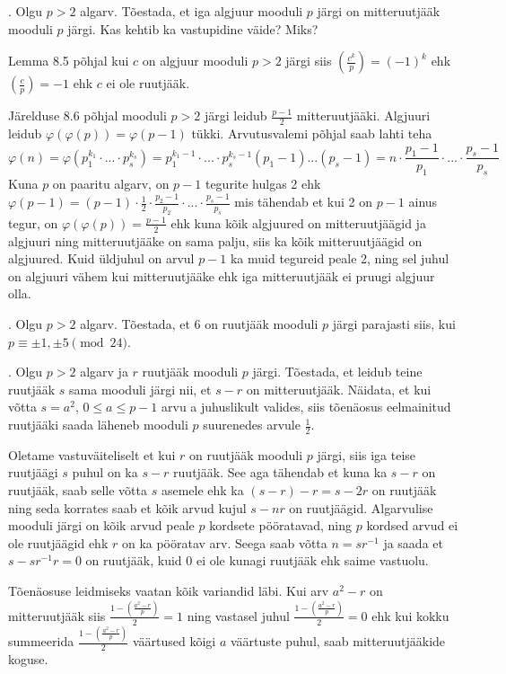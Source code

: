 \documentclass[a4paper, 10pt]{article}
\newcommand{\leg}[2]{\left(\frac{#1}{#2}\right)}
\begin{document}
. Olgu $p>2$ algarv. Tõestada, et iga algjuur mooduli $p$ järgi on mitteruutjääk mooduli $p$ järgi. Kas kehtib ka vastupidine väide? Miks?

\bigskip
Lemma 8.5 põhjal kui $c$ on algjuur mooduli $p>2$ järgi siis $\leg {c^k}p=(-1)^k$ ehk $\leg cp=-1$ ehk $c$ ei ole ruutjääk.

Järelduse 8.6 põhjal mooduli $p>2$ järgi leidub $\frac {p-1}2$ mitteruutjääki. Algjuuri leidub $\varphi(\varphi(p))=\varphi(p-1)$ tükki. Arvutusvalemi põhjal saab lahti teha $$\varphi(n)=\varphi(p_1^{k_1}\cdot...\cdot p_s^{k_s})=p_1^{k_1-1}\cdot...\cdot p_s^{k_s-1}(p_1-1)...(p_s-1)=n\cdot\frac{p_1-1}{p_1}\cdot...\cdot\frac{p_s-1}{p_s}$$
Kuna $p$ on paaritu algarv, on $p-1$ tegurite hulgas 2 ehk $\varphi(p-1)=(p-1)\cdot\frac12\cdot\frac{p_2-1}{p_2}\cdot...\cdot\frac{p_s-1}{p_s}$ mis tähendab et kui 2 on $p-1$ ainus tegur, on $\varphi(\varphi(p))=\frac{p-1}2$ ehk kuna kõik algjuured on mitteruutjäägid ja algjuuri ning mitteruutjääke on sama palju, siis ka kõik mitteruutjäägid on algjuured. Kuid üldjuhul on arvul $p-1$ ka muid tegureid peale 2, ning sel juhul on algjuuri vähem kui mitteruutjääke ehk iga mitteruutjääk ei pruugi algjuur olla.
\bigskip

. Olgu $p>2$ algarv. Tõestada, et 6 on ruutjääk mooduli $p$ järgi parajasti siis, kui $p\equiv \pm1,\pm5\pmod{24}$. 

\bigskip

. Olgu $p>2$ algarv ja $r$ ruutjääk mooduli $p$ järgi. Tõestada, et leidub teine ruutjääk $s$ sama mooduli järgi nii, et $s-r$ on mitteruutjääk. Näidata, et kui võtta $s=a^2$, $0\leq a\leq p-1$ arvu a juhuslikult valides, siis tõenäosus eelmainitud ruutjääki saada läheneb mooduli $p$ suurenedes arvule $\frac12$. 

\bigskip
Oletame vastuväiteliselt et kui $r$ on ruutjääk mooduli $p$ järgi, siis iga teise ruutjäägi $s$ puhul on ka $s-r$ ruutjääk. See aga tähendab et kuna ka $s-r$ on ruutjääk, saab selle võtta $s$ asemele ehk ka $(s-r)-r=s-2r$ on ruutjääk ning seda korrates saab et kõik arvud kujul $s-nr$ on ruutjäägid. Algarvulise mooduli järgi on kõik arvud peale $p$ kordsete pööratavad, ning $p$ kordsed arvud ei ole ruutjäägid ehk $r$ on ka pööratav arv. Seega saab võtta $n=sr^{-1}$ ja saada et $s-sr^{-1}r=0$ on ruutjääk, kuid 0 ei ole kunagi ruutjääk ehk saime vastuolu.

Tõenäosuse leidmiseks vaatan kõik variandid läbi. Kui arv $a^2-r$ on mitteruutjääk siis $\frac{1-\leg {a^2-r}p}2=1$ ning vastasel juhul $\frac{1-\leg {a^2-r}p}2=0$ ehk kui kokku summeerida $\frac{1-\leg {a^2-r}p}2$ väärtused kõigi $a$ väärtuste puhul, saab mitteruutjääkide koguse.
\bigskip
\end{document}
